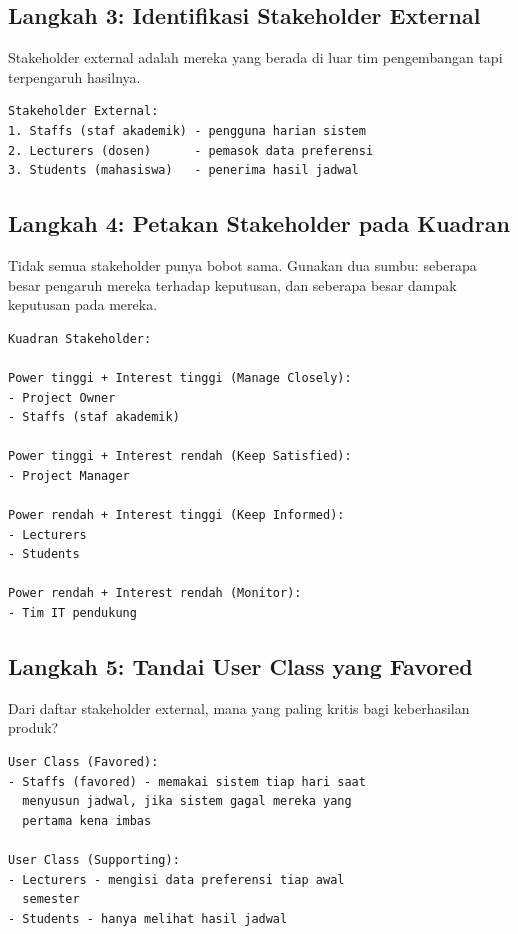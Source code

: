 \documentclass[11pt,a4paper]{article}
\begin{document}
\subsection{Langkah 3: Identifikasi Stakeholder External}

Stakeholder external adalah mereka yang berada di luar tim pengembangan tapi terpengaruh hasilnya.

\begin{lstlisting}[style=out]
Stakeholder External:
1. Staffs (staf akademik) - pengguna harian sistem
2. Lecturers (dosen)      - pemasok data preferensi
3. Students (mahasiswa)   - penerima hasil jadwal
\end{lstlisting}

\subsection{Langkah 4: Petakan Stakeholder pada Kuadran}

Tidak semua stakeholder punya bobot sama. Gunakan dua sumbu: seberapa besar pengaruh mereka terhadap keputusan, dan seberapa besar dampak keputusan pada mereka.

\begin{lstlisting}[style=out]
Kuadran Stakeholder:

Power tinggi + Interest tinggi (Manage Closely):
- Project Owner
- Staffs (staf akademik)

Power tinggi + Interest rendah (Keep Satisfied):
- Project Manager

Power rendah + Interest tinggi (Keep Informed):
- Lecturers
- Students

Power rendah + Interest rendah (Monitor):
- Tim IT pendukung
\end{lstlisting}

\subsection{Langkah 5: Tandai User Class yang Favored}

Dari daftar stakeholder external, mana yang paling kritis bagi keberhasilan produk?

\begin{lstlisting}[style=out]
User Class (Favored):
- Staffs (favored) - memakai sistem tiap hari saat
  menyusun jadwal, jika sistem gagal mereka yang
  pertama kena imbas

User Class (Supporting):
- Lecturers - mengisi data preferensi tiap awal
  semester
- Students - hanya melihat hasil jadwal
\end{lstlisting}
\end{document}
